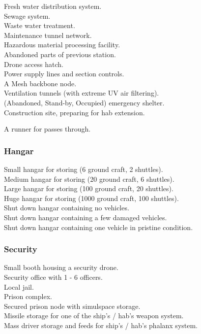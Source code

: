 \documentclass[a4]{article}
\begin{document}
\starttableone
Fresh water distribution system.\\
Sewage system.\\
Waste water treatment.\\
Maintenance tunnel network.\\
Hazardous material processing facility.\\
Abandoned parts of previous station.\\
Drone access hatch.\\
Power supply lines and section controls.\\
A Mesh backbone node.\\
Ventilation tunnels (with extreme UV air filtering).\\
(Abandoned, Stand-by, Occupied) emergency shelter.\\
Construction site, preparing for hab extension.\\
\stoptableone

\starttableone
A runner for  passes through.\\
\stoptableone


\subsubsection{Hangar}

\starttableone
Small hangar for storing (6 ground craft, 2 shuttles).\\
Medium hangar for storing (20 ground craft, 6 shuttles).\\
Large hangar for storing (100 ground craft, 20 shuttles).\\
Huge hangar for storing (1000 ground craft, 100 shuttles).\\
Shut down hangar containing no vehicles.\\
Shut down hangar containing a few damaged vehicles.\\
Shut down hangar containing one vehicle in pristine condition.\\
\stoptableone


\subsubsection{Security}

\starttableone
Small booth housing a security drone.\\
Security office with 1 - 6 officers.\\
Local jail.\\
Prison complex.\\
Secured prison node with simulspace storage.\\
Missile storage for one of the ship's / hab's weapon system.\\
Mass driver storage and feeds for ship's / hab's phalanx system.\\
\stoptableone
\end{document}

